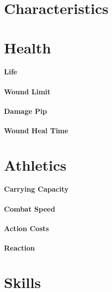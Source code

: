 \section{Characteristics}

\section{Health}

\paragraph{Life}

\paragraph{Wound Limit}

\paragraph{Damage Pip}

\paragraph{Wound Heal Time}

\section{Athletics}
\paragraph{Carrying Capacity}

\paragraph{Combat Speed}

\paragraph{Action Costs}

\paragraph{Reaction}


\section{Skills}


